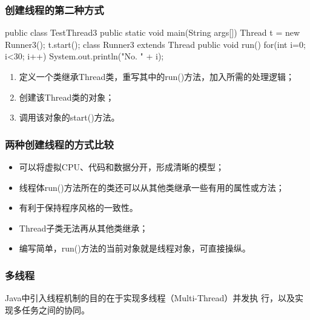 \begin{frame}[fragile] %
  \frametitle{创建线程的第二种方式}

  
  \begin{javaCode}
    public class TestThread3 {
      public static void main(String args[]) {
        Thread t = new Runner3();
        t.start();
      }
    }
    class Runner3 extends Thread {
      public void run() {
        for(int i=0; i<30; i++) {
          System.out.println("No. " + i);
        }
      }
    }
  \end{javaCode}

  \begin{enumerate}
  \item 定义一个类继承Thread类，重写其中的run()方法，加入所需的处理逻辑；
  \item 创建该Thread类的对象；
  \item 调用该对象的start()方法。
  \end{enumerate}
\end{frame}

\begin{frame}[fragile] %
  \frametitle{两种创建线程的方式比较}
  \begin{itemize}
  \item 可以将虚拟CPU、代码和数据分开，形成清晰的模型；
  \item 线程体run()方法所在的类还可以从其他类继承一些有用的属性或方法；
  \item 有利于保持程序风格的一致性。
  \end{itemize}

  \pause
  
  \begin{itemize}
  \item Thread子类无法再从其他类继承；
  \item 编写简单，run()方法的当前对象就是线程对象，可直接操纵。
  \end{itemize}
\end{frame}


\begin{frame}[fragile] %
  \frametitle{多线程}

  Java中引入线程机制的目的在于实现{\hei\Red 多线程（Multi-Thread）并发执
    行，以及实现多任务之间的协同}。


\end{frame}

